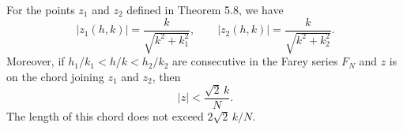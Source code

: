 For the points $z_1$ and $z_2$ defined in Theorem 5.8, we have
$$
|z_1(h, k)| = \frac{k}{\sqrt{k^2 + k_1^2}}, \qquad |z_2(h, k)| = \frac{k}{\sqrt{k^2 + k_2^2}}.
$$
Moreover, if $h_1/k_1 < h/k < h_2/k_2$ are consecutive in the Farey series $F_N$ and $z$ is on the chord joining $z_1$ and $z_2$, then
$$
|z| < \frac{\sqrt{2}\, k}{N}.
$$
The length of this chord does not exceed $2\sqrt{2}\, k / N$.
